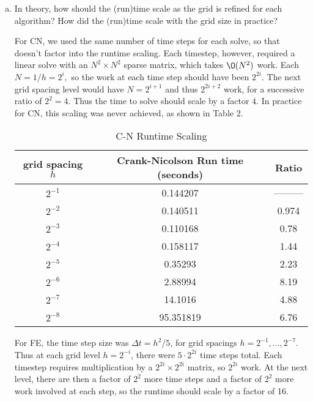 \documentclass[12pt]{article}
\begin{document}
\begin{enumerate}[(a)]
\item In theory, how should the (run)time scale as the grid is refined for each algorithm? How did the (run)time scale with the grid size in practice?

For CN, we used the same number of time steps for each solve, so that doesn't factor into the runtime scaling.  Each timestep, however, required a linear solve with an $N^2\times N^2$ sparse matrix, which takes $\O(N^2)$ work.  Each $N = 1/h = 2^{i},$ so the work at each time step should have been $2^{2i}$. The next grid spacing level would have $N=2^{i+1}$ and thus $2^{2i+2}$ work, for a successive ratio of $2^{2}=4$.  Thus the time to solve should scale by a factor $4$. In practice for CN, this scaling was never achieved, as shown in Table 2.

\begin{table}[H]
\caption{C-N Runtime Scaling}
\centering\begin{tabular}{||c|c|c||}
\hline \hline
   grid spacing $h$ &  Crank-Nicolson Run time (seconds) &   Ratio \\
\hline
    $2^{-1}$ &                  0.144207 &                 --------- \\
    $2^{-2}$ &                  0.140511 &                 0.974 \\
    $2^{-3}$ &                  0.110168 &                 0.78  \\
    $2^{-4}$ &                  0.158117 &                 1.44 \\
    $2^{-5}$ &                  0.35293  &                 2.23  \\
    $2^{-6}$ &                  2.88994  &                8.19   \\
    $2^{-7}$ &                 14.1016   &               4.88    \\
    $2^{-8}$ &                 95.351819 &               6.76 \\ 
\hline \hline
\end{tabular}
\end{table}

For FE, the time step size was $\Delta t = h^2/5$, for grid spacings $h=2^{-1},\dots,2^{-7}$.  Thus at each grid level $h=2^{-i}$, there were $5\cdot2^{2i}$ time steps total.  Each timestep requires multiplication by a $2^{2i} \times 2^{2i}$ matrix, so $2^{2i}$ work.  At the next level, there are then a factor of $2^{2}$ more time steps and a factor of $2^2$ more work involved at each step, so the runtime should scale by a factor of 16.


\end{enumerate}
\end{document}

